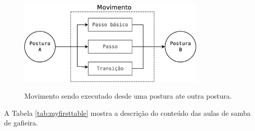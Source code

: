 \documentclass{article}
\begin{document}
\begin{figure}[h]
  \centering
  \caption{ Movimento sendo executado desde uma postura ate outra postura.}
  \includegraphics[width=0.8\textwidth]{Diagrama1.eps}%
  \label{fig:mov}
\end{figure}



A Tabela \ref{tab:myfirsttable} mostra a descrição do conteúdo das aulas de samba de gafieira.
\end{document}
